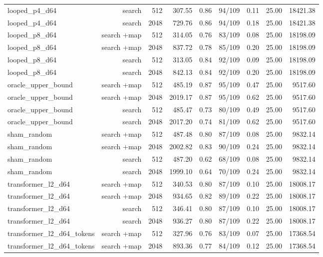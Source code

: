 \begin{table}[t]
\begin{adjustbox}{max width=\linewidth}
\begin{tabular}{lrrrrrrrr}
looped\_p4\_d64 & search & 512 & 307.55 & 0.86 & 94/109 & 0.11 & 25.00 & 18421.38 \\
looped\_p4\_d64 & search & 2048 & 729.76 & 0.86 & 94/109 & 0.18 & 25.00 & 18421.38 \\
looped\_p8\_d64 & search +map & 512 & 314.05 & 0.76 & 83/109 & 0.08 & 25.00 & 18198.09 \\
looped\_p8\_d64 & search +map & 2048 & 837.72 & 0.78 & 85/109 & 0.20 & 25.00 & 18198.09 \\
looped\_p8\_d64 & search & 512 & 313.05 & 0.84 & 92/109 & 0.09 & 25.00 & 18198.09 \\
looped\_p8\_d64 & search & 2048 & 842.13 & 0.84 & 92/109 & 0.20 & 25.00 & 18198.09 \\
oracle\_upper\_bound & search +map & 512 & 485.19 & 0.87 & 95/109 & 0.47 & 25.00 & 9517.60 \\
oracle\_upper\_bound & search +map & 2048 & 2019.17 & 0.87 & 95/109 & 0.62 & 25.00 & 9517.60 \\
oracle\_upper\_bound & search & 512 & 485.47 & 0.73 & 80/109 & 0.49 & 25.00 & 9517.60 \\
oracle\_upper\_bound & search & 2048 & 2017.20 & 0.74 & 81/109 & 0.62 & 25.00 & 9517.60 \\
sham\_random & search +map & 512 & 487.48 & 0.80 & 87/109 & 0.08 & 25.00 & 9832.14 \\
sham\_random & search +map & 2048 & 2002.82 & 0.83 & 90/109 & 0.24 & 25.00 & 9832.14 \\
sham\_random & search & 512 & 487.20 & 0.62 & 68/109 & 0.08 & 25.00 & 9832.14 \\
sham\_random & search & 2048 & 1999.10 & 0.64 & 70/109 & 0.24 & 25.00 & 9832.14 \\
transformer\_l2\_d64 & search +map & 512 & 340.53 & 0.80 & 87/109 & 0.10 & 25.00 & 18008.17 \\
transformer\_l2\_d64 & search +map & 2048 & 934.65 & 0.82 & 89/109 & 0.22 & 25.00 & 18008.17 \\
transformer\_l2\_d64 & search & 512 & 346.41 & 0.80 & 87/109 & 0.10 & 25.00 & 18008.17 \\
transformer\_l2\_d64 & search & 2048 & 936.27 & 0.80 & 87/109 & 0.22 & 25.00 & 18008.17 \\
transformer\_l2\_d64\_tokens & search +map & 512 & 327.96 & 0.76 & 83/109 & 0.07 & 25.00 & 17368.54 \\
transformer\_l2\_d64\_tokens & search +map & 2048 & 893.36 & 0.77 & 84/109 & 0.12 & 25.00 & 17368.54 \\

\end{tabular}
\end{adjustbox}
\end{table}
